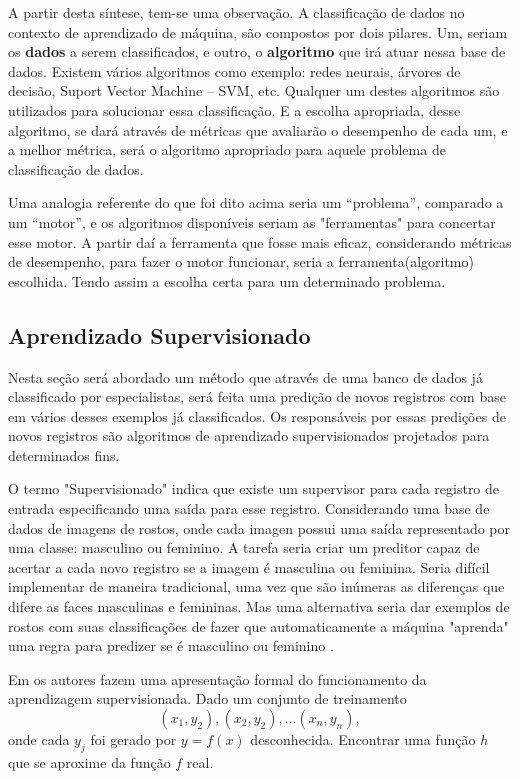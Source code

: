 A partir desta síntese, tem-se uma observação. A classificação de dados no contexto de aprendizado de máquina, são compostos por dois pilares. Um, seriam os \textbf{dados} a serem classificados, e outro, o \textbf{algoritmo} que irá atuar nessa base de dados. Existem vários algoritmos como exemplo: redes neurais, árvores de decisão, Suport Vector Machine – SVM, etc. Qualquer um destes algoritmos são utilizados para solucionar essa classificação. E a escolha apropriada, desse algoritmo, se dará através de métricas que avaliarão o desempenho de cada um, e a melhor métrica, será o algoritmo apropriado para aquele problema de classificação de dados. 

Uma analogia referente do que foi dito acima seria um “problema”,  comparado a um “motor”, e os algoritmos disponíveis seriam as "ferramentas" para concertar esse motor. A partir daí a ferramenta que fosse mais eficaz, considerando métricas de desempenho, para fazer o motor funcionar, seria a ferramenta(algoritmo) escolhida. Tendo assim a escolha certa para um determinado problema.

\subsection{Aprendizado Supervisionado}\label{cap:refTeor:ssec:aprendSup}

Nesta seção será abordado um método que através de uma banco de dados já classificado por especialistas, será feita uma predição de novos registros com base em vários desses exemplos já classificados. Os responsáveis por essas predições de novos registros são algoritmos de aprendizado supervisionados projetados para determinados fins.


O termo "Supervisionado" indica que existe um supervisor para cada registro de entrada especificando uma saída para esse registro. Considerando uma base de dados de imagens de rostos, onde cada imagen possui uma saída representado por uma classe: masculino ou feminino. A tarefa seria criar um preditor capaz de acertar a cada novo registro se a imagem é masculina ou feminina. Seria  difícil  implementar de maneira tradicional, uma vez que são inúmeras as diferenças que difere as faces masculinas e femininas. Mas uma alternativa seria dar exemplos de rostos com suas classificações de fazer que automaticamente a máquina "aprenda" uma regra para predizer se é masculino ou feminino \cite{Barber2011}.

Em \cite{RusselStuart.Norvig2013} os autores fazem uma apresentação formal do funcionamento da aprendizagem supervisionada. Dado um conjunto de treinamento 
\begin{equation}
 (x_{1},y_{2}),(x_{2},y_{2}),...(x_{n},y_{n}),
 \label{eq:aprendSup}
\end{equation}
onde cada ${y_{j}} $ foi gerado por ${y=f(x)}$ desconhecida. Encontrar uma função ${h}$ que se aproxime da função ${f}$ real.


